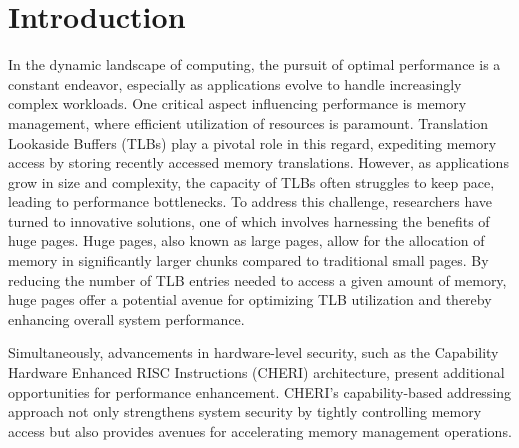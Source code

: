 \documentclass[acmsmall,screen,review]{acmart}
\begin{document}




\maketitle

\section{Introduction}
In the dynamic landscape of computing, the pursuit of optimal performance is a constant endeavor, 
especially as applications evolve to handle increasingly complex workloads. 
One critical aspect influencing performance is memory management, where efficient 
utilization of resources is paramount. Translation Lookaside Buffers (TLBs) play a 
pivotal role in this regard, expediting memory access by storing recently accessed memory translations.
However, as applications grow in size and complexity, the capacity of TLBs often struggles to 
keep pace, leading to performance bottlenecks. To address this challenge, researchers have 
turned to innovative solutions, one of which involves harnessing the benefits of huge pages.
Huge pages, also known as large pages, allow for the allocation of memory in significantly 
larger chunks compared to traditional small pages. By reducing the number of TLB entries 
needed to access a given amount of memory, huge pages offer a potential avenue for optimizing 
TLB utilization and thereby enhancing overall system performance.

Simultaneously, advancements in hardware-level security, such as the Capability Hardware 
Enhanced RISC Instructions (CHERI) architecture, present additional opportunities for 
performance enhancement. CHERI's capability-based addressing approach not only strengthens 
system security by tightly controlling memory access but also provides avenues for 
accelerating memory management operations.
\end{document}
